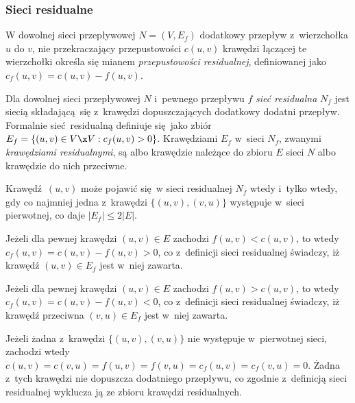 \subsubsection{\textbf{Sieci residualne}}
\par{
  W dowolnej sieci przepływowej $N=(V, E_f)$ dodatkowy przepływ z~wierzchołka $u$ do $v$, nie przekraczający przepustowości $c(u, v)$ krawędzi łączącej te wierzchołki określa się mianem \emph{przepustowości residualnej}, definiowanej jako $c_f(u ,v) = c(u, v) - f(u, v)$.
  \begin{definition}
    Dla dowolnej sieci przepływowej $N$ i~pewnego przepływu $f$ \emph{sieć residualna} $N_f$ jest siecią składającą się z~krawędzi dopuszczających dodatkowy dodatni przepływ. Formalnie sieć residualną definiuje się jako zbiór $E_f=\{(u, v) \in V \x V: c_f(u,v) > 0\}$.
    Krawędziami $E_f$ w~sieci $N_f$, zwanymi \emph{krawędziami residualnymi}, są albo krawędzie należące do zbioru $E$ sieci $N$ albo krawędzie do nich przeciwne.
  \end{definition}
  \begin{theorem}
    Krawędź $(u, v)$ może pojawić się w sieci residualnej $N_f$ wtedy i~tylko wtedy, gdy co najmniej jedna z~krawędzi $\{(u, v), (v, u)\}$ występuje w~sieci pierwotnej, co daje $|E_f| \leq 2|E|$.
  \end{theorem}
  \begin{bproof}
    Jeżeli dla pewnej krawędzi $(u, v) \in E$ zachodzi $f(u, v) < c(u, v)$, to wtedy $c_f(u, v) = c(u, v) - f(u, v) > 0$, co z~definicji sieci residualnej świadczy, iż krawędź $(u, v) \in E_f$ jest w~niej zawarta.

    Jeżeli dla pewnej krawędzi $(u, v) \in E$ zachodzi $f(u, v) > c(u, v)$, to wtedy $c_f(u, v) = c(u, v) - f(u, v) < 0$, co z~definicji sieci residualnej świadczy, iż krawędź przeciwna $(v, u) \in E_f$  jest w~niej zawarta.

    Jeżeli żadna z~krawędzi $\{(u, v), (v, u)\}$ nie występuje w~pierwotnej sieci, zachodzi wtedy $c(u, v) = c(v, u) = f(u, v) = f(v, u) = c_f(u, v) = c_f(v, u)=0$. Żadna z~tych krawędzi nie dopuszcza dodatniego przepływu, co zgodnie z~definicją sieci residualnej wyklucza ją ze zbioru krawędzi residualnych.
  \end{bproof}
}

